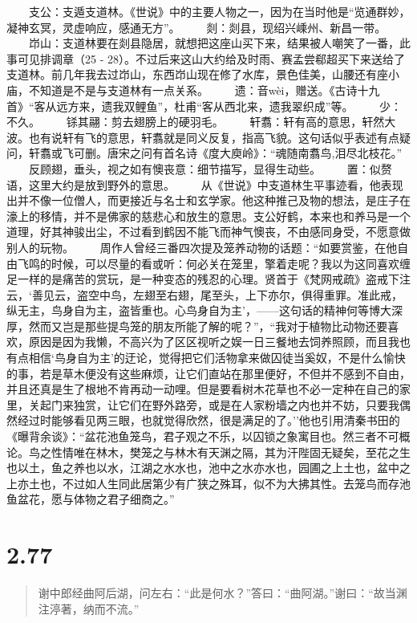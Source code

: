 \documentclass[]{book}
\begin{document}
　　支公：支遁支道林。《世说》中的主要人物之一，因为在当时他是``览通群妙，凝神玄冥，灵虚响应，感通无方''。
　　剡：剡县，现绍兴嵊州、新昌一带。
　　岇山：支道林要在剡县隐居，就想把这座山买下来，结果被人嘲笑了一番，此事可见排调章（25
-
28）。不过后来这山大约给及时雨、赛孟尝郗超买下来送给了支道林。前几年我去过岇山，东西岇山现在修了水库，景色佳美，山腰还有座小庙，不知道是不是与支道林有一点关系。
　　遗：音wèi，赠送。《古诗十九首》``客从远方来，遗我双鲤鱼''，杜甫``客从西北来，遗我翠织成''等。
　　少：不久。 　　铩其翮：剪去翅膀上的硬羽毛。
　　轩翥：轩有高的意思，轩然大波。也有说轩有飞的意思，轩翥就是同义反复，指高飞貌。这句话似乎表述有点疑问，轩翥或飞可删。唐宋之问有首名诗《度大庾岭》：``魂随南翥鸟,泪尽北枝花。''
　　反顾翅，垂头，视之如有懊丧意：细节描写，显得生动些。
　　置：似赘语，这里大约是放到野外的意思。
　　从《世说》中支道林生平事迹看，他表现出并不像一位僧人，而更接近与名士和玄学家。他这种推己及物的想法，是庄子在濠上的移情，并不是佛家的慈悲心和放生的意思。支公好鹤，本来也和养马是一个道理，好其神骏出尘，不过看到鹤因不能飞而神气懊丧，不由感同身受，不愿意做别人的玩物。
　　周作人曾经三番四次提及笼养动物的话题：``如要赏鉴，在他自由飞鸣的时候，可以尽量的看或听：何必关在笼里，擎着走呢？我以为这同喜欢缠足一样的是痛苦的赏玩，是一种变态的残忍的心理。贤首于《梵网戒疏》盗戒下注云，`善见云，盗空中鸟，左翅至右翅，尾至头，上下亦尔，俱得重罪。准此戒，纵无主，鸟身自为主，盗皆重也。心鸟身自为主'，------这句话的精神何等博大深厚，然而又岂是那些提鸟笼的朋友所能了解的呢？''，``我对于植物比动物还要喜欢，原因是因为我懒，不高兴为了区区视听之娱一日三餐地去饲养照顾，而且我也有点相信`鸟身自为主'的迂论，觉得把它们活物拿来做囚徒当奚奴，不是什么愉快的事，若是草木便没有这些麻烦，让它们直站在那里便好，不但并不感到不自由，并且还真是生了根地不肯再动一动哩。但是要看树木花草也不必一定种在自己的家里，关起门来独赏，让它们在野外路旁，或是在人家粉墙之内也并不妨，只要我偶然经过时能够看见两三眼，也就觉得欣然，很是满足的了。''他也引用清秦书田的《曝背余谈》：``盆花池鱼笼鸟，君子观之不乐，以囚锁之象寓目也。然三者不可概论。鸟之性情唯在林木，樊笼之与林木有天渊之隔，其为汗陛固无疑矣，至花之生也以土，鱼之养也以水，江湖之水水也，池中之水亦水也，园圃之上土也，盆中之上亦土也，不过如人生同此居第少有广狭之殊耳，似不为大拂其性。去笼鸟而存池鱼盆花，愿与体物之君子细商之。''

\section{2.77}\label{section-123}

\begin{quote}
谢中郎经曲阿后湖，问左右：``此是何水？''答曰：``曲阿湖。''谢曰：``故当渊注渟著，纳而不流。''
\end{quote}
\end{document}
